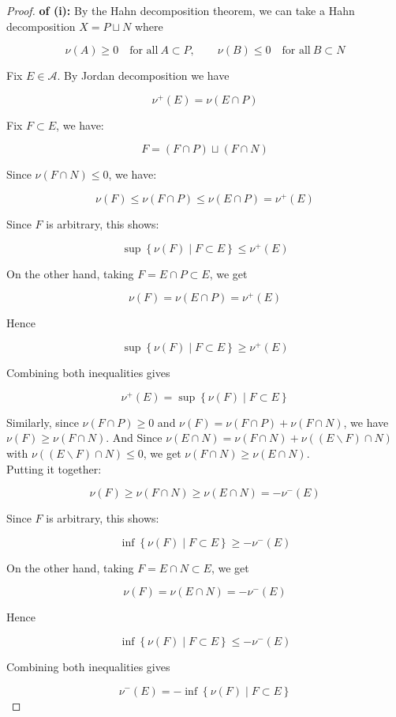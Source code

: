 \begin{proof}

\textbf{of (i):} By the Hahn decomposition theorem, we can take a Hahn decomposition \(X = P \sqcup N\) where

\[\nu(A) \geq 0\quad\text{for all}\ A \subset P,\qquad\nu(B) \leq 0\quad\text{for all}\ B \subset N\]

Fix \(E \in \mathcal{A}\). By Jordan decomposition we have

\[\nu^{+}(E) = \nu(E \cap P)\]

Fix \(F \subset E\), we have:

\[F = (F \cap P) \sqcup (F \cap N)\]

Since \(\nu(F \cap N) \leq 0\), we have:

\[\nu(F) \leq \nu(F \cap P) \leq \nu(E \cap P) = \nu^{+}(E)\]

Since \(F\) is arbitrary, this shows:

\[\sup\left\{ {\nu(F) \mid F \subset E} \right\} \leq \nu^{+}(E)\]

On the other hand, taking \(F = E \cap P \subset E\), we get

\[\nu(F) = \nu(E \cap P) = \nu^{+}(E)\]

Hence

\[\sup\left\{ {\nu(F) \mid F \subset E} \right\} \geq \nu^{+}(E)\]

Combining both inequalities gives

\[\nu^{+}(E) = \sup\left\{ {\nu(F) \mid F \subset E} \right\}\]

Similarly, since \(\nu(F \cap P) \geq 0\) and \(\nu(F) = \nu(F \cap P) + \nu(F \cap N)\), we have \(\nu(F) \geq \nu(F \cap N)\). And Since \(\nu(E \cap N) = \nu(F \cap N) + \nu((E\backslash F) \cap N)\) with \(\nu((E\backslash F) \cap N) \leq 0\), we get \(\nu(F \cap N) \geq \nu(E \cap N)\).\\
Putting it together:

\[\nu(F) \geq \nu(F \cap N) \geq \nu(E \cap N) = - \nu^{-}(E)\]

Since \(F\) is arbitrary, this shows:

\[\inf\left\{ {\nu(F) \mid F \subset E} \right\} \geq - \nu^{-}(E)\]

On the other hand, taking \(F = E \cap N \subset E\), we get

\[\nu(F) = \nu(E \cap N) = - \nu^{-}(E)\]

Hence

\[\inf\left\{ {\nu(F) \mid F \subset E} \right\} \leq - \nu^{-}(E)\]

Combining both inequalities gives

\[\nu^{-}(E) = - \inf\left\{ {\nu(F) \mid F \subset E} \right\}\]

\end{proof}

